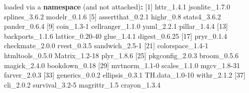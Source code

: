 \documentclass[
]{book}
\newenvironment{Shaded}{\begin{snugshade}}{\end{snugshade}}
\newcommand{\DecValTok}[1]{\textcolor[rgb]{0.00,0.00,0.81}{#1}}
\newcommand{\FloatTok}[1]{\textcolor[rgb]{0.00,0.00,0.81}{#1}}
\newcommand{\KeywordTok}[1]{\textcolor[rgb]{0.13,0.29,0.53}{\textbf{#1}}}
\newcommand{\NormalTok}[1]{#1}
\newcommand{\OperatorTok}[1]{\textcolor[rgb]{0.81,0.36,0.00}{\textbf{#1}}}
\newcommand{\StringTok}[1]{\textcolor[rgb]{0.31,0.60,0.02}{#1}}
\begin{document}
\begin{Shaded}
\begin{Highlighting}[]
\NormalTok{loaded via a }\KeywordTok{namespace}\NormalTok{ (and not attached)}\OperatorTok{:}
\StringTok{ }\NormalTok{[}\DecValTok{1}\NormalTok{] httr_}\DecValTok{1}\NormalTok{.}\FloatTok{4.1}\NormalTok{         jsonlite_}\DecValTok{1}\NormalTok{.}\FloatTok{7.0}\NormalTok{     splines_}\DecValTok{3}\NormalTok{.}\FloatTok{6.2}\NormalTok{      modelr_}\DecValTok{0}\NormalTok{.}\FloatTok{1.6}      
\NormalTok{ [}\DecValTok{5}\NormalTok{] assertthat_}\DecValTok{0}\NormalTok{.}\FloatTok{2.1}\NormalTok{   highr_}\FloatTok{0.8}\NormalTok{          stats4_}\DecValTok{3}\NormalTok{.}\FloatTok{6.2}\NormalTok{       pander_}\DecValTok{0}\NormalTok{.}\FloatTok{6.4}      
\NormalTok{ [}\DecValTok{9}\NormalTok{] coin_}\FloatTok{1.3}\DecValTok{-1}\NormalTok{         cellranger_}\DecValTok{1}\NormalTok{.}\FloatTok{1.0}\NormalTok{   yaml_}\DecValTok{2}\NormalTok{.}\FloatTok{2.1}\NormalTok{         pillar_}\DecValTok{1}\NormalTok{.}\FloatTok{4.4}      
\NormalTok{[}\DecValTok{13}\NormalTok{] backports_}\DecValTok{1}\NormalTok{.}\FloatTok{1.6}\NormalTok{    lattice_}\FloatTok{0.20}\DecValTok{-40}\NormalTok{    glue_}\DecValTok{1}\NormalTok{.}\FloatTok{4.1}\NormalTok{         digest_}\DecValTok{0}\NormalTok{.}\FloatTok{6.25}     
\NormalTok{[}\DecValTok{17}\NormalTok{] pryr_}\DecValTok{0}\NormalTok{.}\FloatTok{1.4}\NormalTok{         checkmate_}\DecValTok{2}\NormalTok{.}\FloatTok{0.0}\NormalTok{    rvest_}\DecValTok{0}\NormalTok{.}\FloatTok{3.5}\NormalTok{        sandwich_}\FloatTok{2.5}\DecValTok{-1}    
\NormalTok{[}\DecValTok{21}\NormalTok{] colorspace_}\FloatTok{1.4}\DecValTok{-1}\NormalTok{   htmltools_}\DecValTok{0}\NormalTok{.}\FloatTok{5.0}\NormalTok{    Matrix_}\FloatTok{1.2}\DecValTok{-18}\NormalTok{      plyr_}\DecValTok{1}\NormalTok{.}\FloatTok{8.6}        
\NormalTok{[}\DecValTok{25}\NormalTok{] pkgconfig_}\DecValTok{2}\NormalTok{.}\FloatTok{0.3}\NormalTok{    broom_}\DecValTok{0}\NormalTok{.}\FloatTok{5.6}\NormalTok{        magick_}\DecValTok{2}\NormalTok{.}\FloatTok{4.0}\NormalTok{       bookdown_}\FloatTok{0.18}     
\NormalTok{[}\DecValTok{29}\NormalTok{] mvtnorm_}\FloatTok{1.1}\DecValTok{-0}\NormalTok{      scales_}\DecValTok{1}\NormalTok{.}\FloatTok{1.0}\NormalTok{       mgcv_}\FloatTok{1.8}\DecValTok{-31}\NormalTok{        farver_}\DecValTok{2}\NormalTok{.}\FloatTok{0.3}      
\NormalTok{[}\DecValTok{33}\NormalTok{] generics_}\DecValTok{0}\NormalTok{.}\FloatTok{0.2}\NormalTok{     ellipsis_}\DecValTok{0}\NormalTok{.}\FloatTok{3.1}\NormalTok{     TH.data_}\FloatTok{1.0}\DecValTok{-10}\NormalTok{     withr_}\DecValTok{2}\NormalTok{.}\FloatTok{1.2}       
\NormalTok{[}\DecValTok{37}\NormalTok{] cli_}\DecValTok{2}\NormalTok{.}\FloatTok{0.2}\NormalTok{          survival_}\FloatTok{3.2}\DecValTok{-5}\NormalTok{     magrittr_}\FloatTok{1.5}\NormalTok{       crayon_}\DecValTok{1}\NormalTok{.}\FloatTok{3.4}      

\end{Highlighting}
\end{Shaded}
\end{document}
